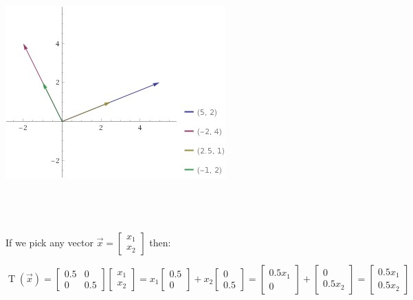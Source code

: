 \documentclass[12pt, letterpaper]{article}
\theoremstyle{statement}
\begin{document}
            \\\\
            {\centering 
            \includegraphics{vectors1}
            \centering
            \par}
            \\\\
            
            \\If we pick any vector $\vec{x}=\begin{bmatrix} x_1\\x_2\end{bmatrix}$ then:
            
            $$
             \operatorname{T}(\vec{x})=\begin{bmatrix} 0.5 & 0 \\ 0 & 0.5\end{bmatrix} \begin{bmatrix} x_1\\x_2 \end{bmatrix}
            = x_1 \begin{bmatrix} 0.5\\0\end{bmatrix} + x_2 \begin{bmatrix} 0\\0.5\end{bmatrix}
            = \begin{bmatrix} 0.5x_1\\0\end{bmatrix} + \begin{bmatrix} 0\\0.5x_2\end{bmatrix}
            = \begin{bmatrix}0.5x_1 \\ 0.5x_2 \end{bmatrix}
            $$
            
\end{document}
